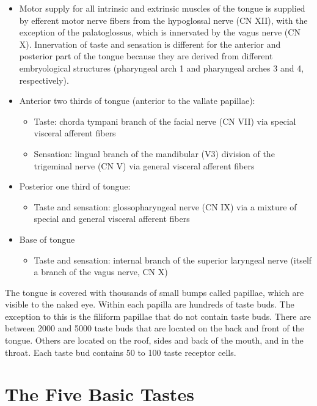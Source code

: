 \begin{itemize}
\item
  Motor supply for all intrinsic and extrinsic muscles of the tongue is supplied by efferent motor nerve fibers from the hypoglossal nerve (CN XII), with the exception of the palatoglossus, which is innervated by the vagus nerve (CN X).
  Innervation of taste and sensation is different for the anterior and posterior part of the tongue because they are derived from different embryological structures (pharyngeal arch 1 and pharyngeal arches 3 and 4, respectively).
\item
  Anterior two thirds of tongue (anterior to the vallate papillae):

  \begin{itemize}
  \tightlist
  \item
    Taste: chorda tympani branch of the facial nerve (CN VII) via special visceral afferent fibers
  \item
    Sensation: lingual branch of the mandibular (V3) division of the trigeminal nerve (CN V) via general visceral afferent fibers
  \end{itemize}
\item
  Posterior one third of tongue:

  \begin{itemize}
  \tightlist
  \item
    Taste and sensation: glossopharyngeal nerve (CN IX) via a mixture of special and general visceral afferent fibers
  \end{itemize}
\item
  Base of tongue

  \begin{itemize}
  \tightlist
  \item
    Taste and sensation: internal branch of the superior laryngeal nerve (itself a branch of the vagus nerve, CN X)
  \end{itemize}
\end{itemize}

The tongue is covered with thousands of small bumps called papillae, which are visible to the naked eye. Within each papilla are hundreds of taste buds. The exception to this is the filiform papillae that do not contain taste buds. There are between 2000 and 5000 taste buds that are located on the back and front of the tongue. Others are located on the roof, sides and back of the mouth, and in the throat. Each taste bud contains 50 to 100 taste receptor cells.

\hypertarget{the-five-basic-tastes}{%
\section{The Five Basic Tastes}\label{the-five-basic-tastes}}

